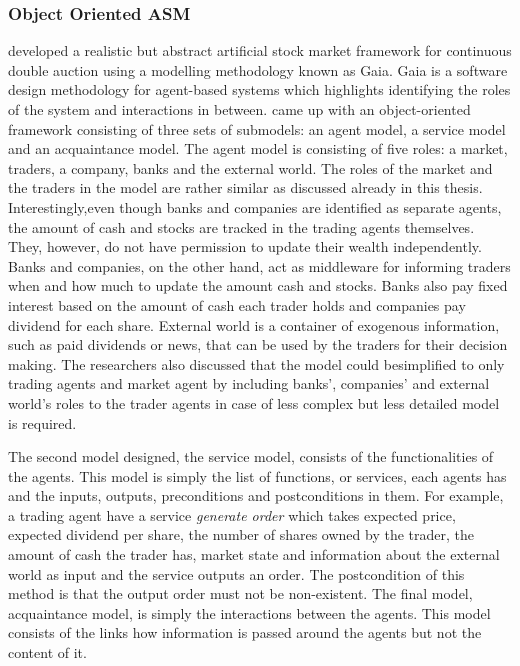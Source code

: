 \subsubsection{Object Oriented ASM}
\citet{Ben12} developed a realistic but abstract artificial stock market
framework for continuous double auction using a modelling methodology known as 
Gaia. Gaia is a software design methodology for agent-based systems which 
highlights identifying the roles of the system and interactions in between.
\citeauthor{Ben12} came up with an object-oriented framework consisting of three sets of submodels: 
an agent model, a service model and an acquaintance model. The agent model is consisting of 
five roles: a market, traders, a company, banks and the external world. 
The roles of the market and the traders in the model are rather similar 
as discussed already in this thesis. Interestingly,even though banks and 
companies are identified as separate agents, the amount of cash and stocks 
are tracked in the trading agents themselves. They, however, do not have permission 
to update their wealth independently. Banks and companies, on the other hand, act 
as middleware for informing traders when and how much to update the amount cash 
and stocks. Banks also pay fixed interest based on the amount of cash each trader 
holds and companies pay dividend for each share. External world is a container of 
exogenous information, such as paid dividends or news, that can be used by the 
traders for their decision making. The researchers also discussed that the model 
could besimplified to only trading agents and market agent by including banks', 
companies' and external world's roles to the trader agents in case of less complex but 
less detailed model is required.

The second model \citeauthor{Ben12} designed, the service model,
consists of the functionalities of the agents. This model is simply the list of 
functions, or services, each agents has and the inputs, outputs, preconditions and postconditions 
in them. For example, a trading agent have a service \textit{generate order} which takes
expected price, expected dividend per share, the number of shares owned by the trader, 
the amount of cash the trader has, market state and information about the external world as input 
and the service outputs an order. The postcondition of this method is that the output order 
must not be non-existent. The final model, acquaintance model, is simply the interactions 
between the agents. This model consists of the links how information is passed around the 
agents but not the content of it.

